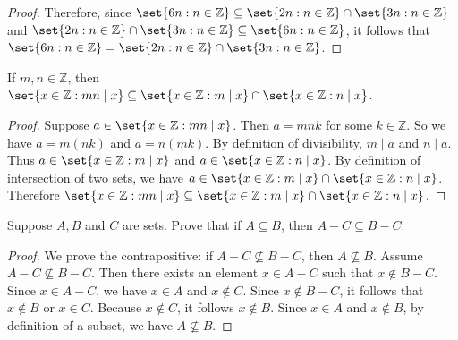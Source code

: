 \documentclass[DIN, pagenumber=false, fontsize=11pt, parskip=half]{scrartcl}
\begin{document}
\begin{problems}
\begin{proof}
        Therefore, since  $\set{6n : n \in \mathbb{Z}} \subseteq \set{2n : n \in \mathbb{Z}} \cap \set{3n : n \in \mathbb{Z}}$ and $\set{2n : n \in \mathbb{Z}} \cap \set{3n : n \in \mathbb{Z}} \subseteq \set{6n : n \in \mathbb{Z}}$, it follows that $\set{6n : n \in \mathbb{Z}} = \set{2n : n \in \mathbb{Z}} \cap \set{3n : n \in \mathbb{Z}}$.
    \end{proof}

    \problem If $m,n \in \mathbb{Z}$, then $\set{x \in \mathbb{Z} : mn \mid x} \subseteq \set{x \in \mathbb{Z} : m \mid x} \cap \set{x \in \mathbb{Z} : n \mid x}$.
    \begin{proof}
        Suppose $a \in \set{x \in \mathbb{Z} : mn \mid x}$.
        Then $a = mnk$ for some $k \in \mathbb{Z}$.
        So we have $a = m(nk)$ and $a = n(mk)$.
        By definition of divisibility, $m \mid a$ and $n \mid a$.
        Thus $a \in \set{x \in \mathbb{Z} : m \mid x}$ and $a \in \set{x \in \mathbb{Z} : n \mid x}$.
        By definition of intersection of two sets, we have $a \in \set{x \in \mathbb{Z} : m \mid x} \cap \set{x \in \mathbb{Z} : n \mid x}$.
        Therefore $\set{x \in \mathbb{Z} : mn \mid x} \subseteq \set{x \in \mathbb{Z} : m \mid x} \cap \set{x \in \mathbb{Z} : n \mid x}$.
    \end{proof}

    \problem Suppose $A,B$ and $C$ are sets. Prove that if $A \subseteq B$, then $A - C \subseteq B - C$.
    \begin{proof}
        We prove the contrapositive: if $A - C \not\subseteq B - C$, then $A \not\subseteq B$.
        Assume $A - C \not\subseteq B - C$.
        Then there exists an element $x \in A - C$ such that $x \not\in B - C$.
        Since $x \in A - C$, we have $x \in A$ and $x \not\in C$.
        Since $x \not\in B - C$, it follows that $x \not\in B$ or $x \in C$.
        Because $x \not\in C$, it follows $x \not\in B$.
        Since $x \in A$ and $x \not\in B$, by definition of a subset, we have $A \not\subseteq B$.
    \end{proof}


\end{problems}
\end{document}
